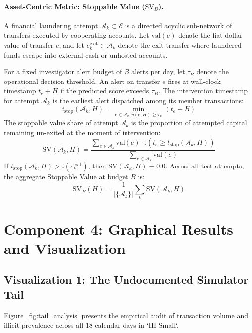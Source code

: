 \documentclass[11pt,a4paper]{article}
\begin{document}
\paragraph{Asset-Centric Metric: Stoppable Value ($\text{SV}_B$).} A financial laundering attempt $\mathcal{A}_k \subset \mathcal{E}$ is a directed acyclic sub-network of transfers executed by cooperating accounts. Let $\text{val}(e)$ denote the fiat dollar value of transfer $e$, and let $e_k^{\text{exit}} \in \mathcal{A}_k$ denote the exit transfer where laundered funds escape into external cash or unhosted accounts.

For a fixed investigator alert budget of $B$ alerts per day, let $\tau_B$ denote the operational decision threshold. An alert on transfer $e$ fires at wall-clock timestamp $t_e + H$ if the predicted score exceeds $\tau_B$. The intervention timestamp for attempt $\mathcal{A}_k$ is the earliest alert dispatched among its member transactions:
\begin{equation}
t_{\text{stop}}(\mathcal{A}_k, H) = \min_{e \in \mathcal{A}_k : \hat{y}(e, H) \ge \tau_B} (t_e + H)
\end{equation}
The stoppable value share of attempt $\mathcal{A}_k$ is the proportion of attempted capital remaining un-exited at the moment of intervention:
\begin{equation}
\text{SV}(\mathcal{A}_k, H) = \frac{\sum_{e \in \mathcal{A}_k} \text{val}(e) \cdot \mathbb{I}(t_e \ge t_{\text{stop}}(\mathcal{A}_k, H))}{\sum_{e \in \mathcal{A}_k} \text{val}(e)}
\end{equation}
If $t_{\text{stop}}(\mathcal{A}_k, H) > t(e_k^{\text{exit}})$, then $\text{SV}(\mathcal{A}_k, H) = 0.0$. Across all test attempts, the aggregate Stoppable Value at budget $B$ is:
\begin{equation}
\text{SV}_B(H) = \frac{1}{|\{\mathcal{A}_k\}|} \sum_k \text{SV}(\mathcal{A}_k, H)
\end{equation}

\section{Component 4: Graphical Results and Visualization}
\label{sec:comp4_visualizations}

\subsection{Visualization 1: The Undocumented Simulator Tail}
Figure~\ref{fig:tail_analysis} presents the empirical audit of transaction volume and illicit prevalence across all 18 calendar days in `HI-Small`.
\end{document}
